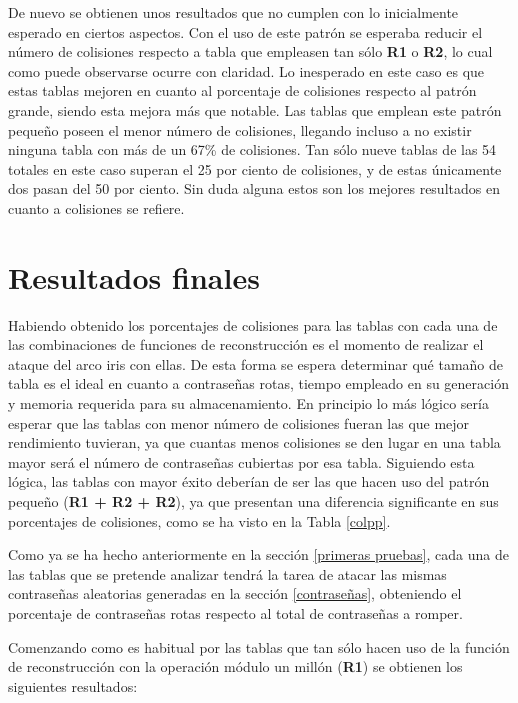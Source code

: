 \documentclass[12pt,spanish,listoffigures,listoftables]{tfgetsinf}
\begin{document}
De nuevo se obtienen unos resultados que no cumplen con lo inicialmente esperado en ciertos aspectos. Con el uso de este patrón se esperaba reducir el número de colisiones respecto a tabla que empleasen tan sólo \textbf{R1} o \textbf{R2}, lo cual como puede observarse ocurre con claridad. Lo inesperado en este caso es que estas tablas mejoren en cuanto al porcentaje de colisiones respecto al patrón grande, siendo esta mejora más que notable. Las tablas que emplean este patrón pequeño poseen el menor número de colisiones, llegando incluso a no existir ninguna tabla con más de un 67\% de colisiones. Tan sólo nueve tablas de las 54 totales en este caso superan el 25 por ciento de colisiones, y de estas únicamente dos pasan del 50 por ciento. Sin duda alguna estos son los mejores resultados en cuanto a colisiones se refiere.
~\\

\section{Resultados finales}

Habiendo obtenido los porcentajes de colisiones para las tablas con cada una de las combinaciones de funciones de reconstrucción es el momento de realizar el ataque del arco iris con ellas. De esta forma se espera determinar qué tamaño de tabla es el ideal en cuanto a contraseñas rotas, tiempo empleado en su generación y memoria requerida para su almacenamiento. En principio lo más lógico sería esperar que las tablas con menor número de colisiones fueran las que mejor rendimiento tuvieran, ya que cuantas menos colisiones se den lugar en una tabla mayor será el número de contraseñas cubiertas por esa tabla. Siguiendo esta lógica, las tablas con mayor éxito deberían de ser las que hacen uso del patrón pequeño (\textbf{R1 + R2 + R2}), ya que presentan una diferencia significante en sus porcentajes de colisiones, como se ha visto en la Tabla \ref{colpp}.

Como ya se ha hecho anteriormente en la sección \ref{primeras pruebas}, cada una de las tablas que se pretende analizar tendrá la tarea de atacar las mismas contraseñas aleatorias generadas en la sección \ref{contraseñas}, obteniendo el porcentaje de contraseñas rotas respecto al total de contraseñas a romper.

Comenzando como es habitual por las tablas que tan sólo hacen uso de la función de reconstrucción con la operación módulo un millón (\textbf{R1}) se obtienen los siguientes resultados:
\\
\\
\\
\end{document}
